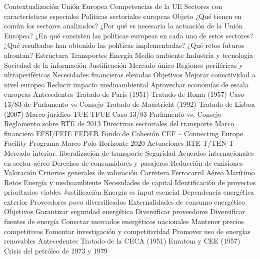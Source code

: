 \documentclass{nuevotema}
\begin{document}
\esquemacorto

\begin{esquema}[enumerate]
	\1[] 
		\2 Contextualización
			\3 Unión Europea
			\3 Competencias de la UE
			\3 Sectores con características especiales
			\3 Políticas sectoriales europeas
		\2 Objeto
			\3 ¿Qué tienen en común los sectores analizados?
			\3 ¿Por qué es necesaria la actuación de la Unión Europea?
			\3 ¿En qué consisten las políticas europeas en cada uno de estos sectores?
			\3 ¿Qué resultados han obtenido las políticas implementadas?
			\3 ¿Qué retos futuros afrontan?
		\2 Estructura
			\3 Transportes
			\3 Energía
			\3 Medio ambiente
			\3 Industria y tecnología
			\3 Sociedad de la información
	\1 
		\2 Justificación
			\3 Mercado único
			\3 Regiones periféricas y ultraperiféricas
			\3 Necesidades financieras elevadas
		\2 Objetivos
			\3 Mejorar conectividad a nivel europeo
			\3 Reducir impacto medioambiental
			\3 Aprovechar economías de escala europeas
		\2 Antecedentes
			\3 Tratado de París (1951)
			\3 Tratado de Roma (1957)
			\3 Caso 13/83 de Parlamento vs Consejo
			\3 Tratado de Maastricht (1992)
			\3 Tratado de Lisboa (2007)
		\2 Marco jurídico
			\3 TUE
			\3 TFUE
			\3 Caso 13/83 Parlamento vs. Consejo
			\3 Reglamento sobre RTE de 2013
			\3 Directivas sectoriales del transporte
		\2 Marco financiero
			\3 EFSI/FEIE
			\3 FEDER
			\3 Fondo de Cohesión
			\3 CEF -- Connecting Europe Facility
			\3 Programa Marco Polo
			\3 Horizonte 2020
		\2 Actuaciones
			\3 RTE-T/TEN-T
			\3 Mercado interior: liberalización de transporte
			\3 Seguridad
			\3 Acuerdos internacionales en sector aéreo
			\3 Derechos de consumidores y pasajeros
			\3 Reducción de emisiones
		\2 Valoración
			\3 Criterios generales de valoración
			\3 Carretera
			\3 Ferrocarril
			\3 Aéreo
			\3 Marítimo
		\2 Retos
			\3 Energía y medioambiente
			\3 Necesidades de capital
			\3 Identificación de proyectos prioritarios viables
	\1 
		\2 Justificación
			\3 Energía es input esencial
			\3 Dependencia energética exterior
			\3 Proveedores poco diversificados
			\3 Externalidades de consumo energético
		\2 Objetivos
			\3 Garantizar seguridad energética
			\3 Diversificar proveedores
			\3 Diversificar fuentes de energía
			\3 Conectar mercados energéticos nacionales
			\3 Mantener precios competitivos
			\3 Fomentar investigación y competitividad
			\3 Promover uso de energías renovables
		\2 Antecedentes
			\3 Tratado de la CECA (1951)
			\3 Euratom y CEE (1957)
			\3 Crisis del petróleo de 1973 y 1979

\end{esquema}
\end{document}
